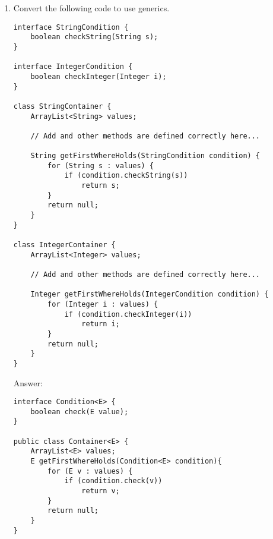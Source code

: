 \documentclass[11pt]{article}
\newenvironment{answer}{\large\lstset{basicstyle=\tiny\ttfamily}\color{white} \small{Answer:}}{}
\newenvironment{answer}{\large\lstset{basicstyle=\large\ttfamily}\color{red} \small{Answer:}}{}
\begin{document}
\begin{enumerate}
\newpage
\item Convert the following code to use generics.
\begin{lstlisting}
interface StringCondition {
	boolean checkString(String s);
}

interface IntegerCondition {
	boolean checkInteger(Integer i);
}

class StringContainer {
	ArrayList<String> values;
	
	// Add and other methods are defined correctly here...

	String getFirstWhereHolds(StringCondition condition) {
		for (String s : values) {
			if (condition.checkString(s))
				return s;
		}
		return null;
	}
}

class IntegerContainer {
	ArrayList<Integer> values;

	// Add and other methods are defined correctly here...

	Integer getFirstWhereHolds(IntegerCondition condition) {
		for (Integer i : values) {
			if (condition.checkInteger(i))
				return i;
		}
		return null;
	}
}
\end{lstlisting}

\begin{answer}
\begin{lstlisting}
interface Condition<E> {
	boolean check(E value);
}

public class Container<E> {
	ArrayList<E> values;
	E getFirstWhereHolds(Condition<E> condition){
		for (E v : values) {
			if (condition.check(v))
				return v;
		}
		return null;
	}
}
\end{lstlisting}
\end{answer}

\end{enumerate}
\end{document}
